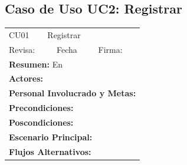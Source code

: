 
\subsection{Caso de Uso UC2: Registrar}

\begin{longtable}{|l|p{5.5cm}|l|p{2cm}|l|p{1.9cm}|} \hline
    \cellcolor{grisOscuro} CU01 & \multicolumn{4}{|l|}{  \cellcolor{grisOscuro} Registrar} &  \cellcolor{grisClaro}\multirow{2}{1cm}{} \\ \cline{1-5}
    \cellcolor{grisOscuro} Revisa: &  \cellcolor{grisClaro} &  \cellcolor{grisOscuro} Fecha &  \cellcolor{grisClaro} &  \cellcolor{grisOscuro} Firma: & \cellcolor{grisClaro} \\ \hline
    \multicolumn{6}{|p{15cm}|}{ \textbf{Resumen: } En

    } \\ \hline

    \multicolumn{6}{|p{15cm}|}{ \textbf{Actores: }

    } \\ \hline

    \multicolumn{6}{|p{15cm}|}{ \textbf{Personal Involucrado y Metas: }

    } \\ \hline

    \multicolumn{6}{|p{15cm}|}{ \textbf{Precondiciones: }

    } \\ \hline

    \multicolumn{6}{|p{15cm}|}{ \textbf{Poscondiciones: }

    } \\ \hline

    \multicolumn{6}{|p{15cm}|}{ \textbf{Escenario Principal: }

    } \\ \hline

    \multicolumn{6}{|p{15cm}|}{ \textbf{Flujos Alternativos: }

    } \\ \hline

\end{longtable}

